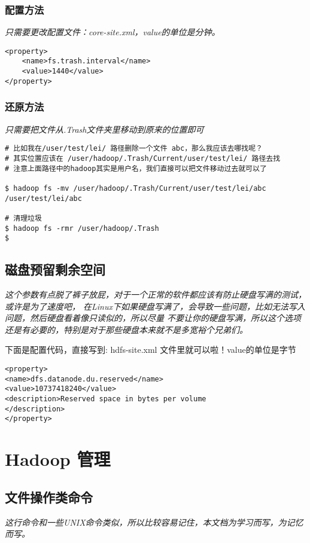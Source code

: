 \documentclass{article}
\begin{document}
\subsubsection{配置方法}
\textit{
只需要更改配置文件：core-site.xml，value的单位是分钟。
}

\begin{verbatim}
<property>
	<name>fs.trash.interval</name>
	<value>1440</value>
</property>
\end{verbatim}

\subsubsection{还原方法}
\textit{
只需要把文件从.Trash文件夹里移动到原来的位置即可
}

\begin{verbatim}
# 比如我在/user/test/lei/ 路径删除一个文件 abc，那么我应该去哪找呢？
# 其实位置应该在 /user/hadoop/.Trash/Current/user/test/lei/ 路径去找
# 注意上面路径中的hadoop其实是用户名，我们直接可以把文件移动过去就可以了

$ hadoop fs -mv /user/hadoop/.Trash/Current/user/test/lei/abc /user/test/lei/abc

# 清理垃圾
$ hadoop fs -rmr /user/hadoop/.Trash
$
\end{verbatim}

\subsection{磁盘预留剩余空间}
\textit{
这个参数有点脱了裤子放屁，对于一个正常的软件都应该有防止硬盘写满的测试，或许是为了速度吧，
在Linux下如果硬盘写满了，会导致一些问题，比如无法写入问题，然后硬盘看着像只读似的，所以尽量
不要让你的硬盘写满，所以这个选项还是有必要的，特别是对于那些硬盘本来就不是多宽裕个兄弟们。
}

下面是配置代码，直接写到: hdfs-site.xml 文件里就可以啦！value的单位是字节

\begin{verbatim}
<property> 
<name>dfs.datanode.du.reserved</name> 
<value>10737418240</value> 
<description>Reserved space in bytes per volume
</description> 
</property>
\end{verbatim}


\section{Hadoop 管理}
\subsection{文件操作类命令}
\textit{
这行命令和一些UNIX命令类似，所以比较容易记住，本文档为学习而写，为记忆而写。
}
\end{document}
